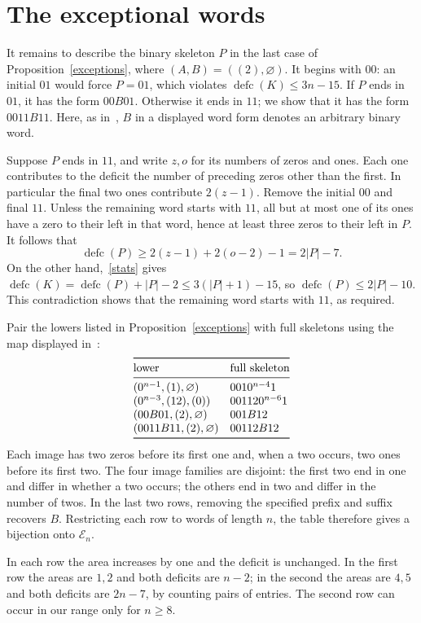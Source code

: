 \documentclass[11pt]{article}
\DeclareMathOperator{\defc}{defc}\DeclareMathOperator{\sym}{sym}
\begin{document}
\section{The exceptional words}
It remains to describe the binary skeleton $P$ in the last case of Proposition~\ref{exceptions}, where $(A,B)=((2),\varnothing)$. It begins with $00$: an initial $01$ would force $P=01$, which violates $\defc(K)\le3n-15$. If $P$ ends in $01$, it has the form $00B01$. Otherwise it ends in $11$; we show that it has the form $0011B11$. Here, as in~\cite[\S6.3]{H}, $B$ in a displayed word form denotes an arbitrary binary word.

Suppose $P$ ends in $11$, and write $z,o$ for its numbers of zeros and ones. Each one contributes to the deficit the number of preceding zeros other than the first. In particular the final two ones contribute $2(z-1)$. Remove the initial $00$ and final $11$. Unless the remaining word starts with $11$, all but at most one of its ones have a zero to their left in that word, hence at least three zeros to their left in $P$. It follows that
\[
 \defc(P)\ge 2(z-1)+2(o-2)-1=2|P|-7.
\]
On the other hand,~\eqref{stats} gives $\defc(K)=\defc(P)+|P|-2\le3(|P|+1)-15$, so $\defc(P)\le2|P|-10$. This contradiction shows that the remaining word starts with $11$, as required.

Pair the lowers listed in Proposition~\ref{exceptions} with full skeletons using the map displayed in~\cite[\S6.3]{H}:
\[
\begin{array}{@{}ll@{}}\toprule
 \text{lower}&\text{full skeleton}\\\midrule
 (0^{n-1},(1),\varnothing)&0010^{n-4}1\\
 (0^{n-3},(12),(0))&001120^{n-6}1\\
 (00B01,(2),\varnothing)&001B12\\
 (0011B11,(2),\varnothing)&00112B12\\\bottomrule
\end{array}
\]
Each image has two zeros before its first one and, when a two occurs, two ones before its first two. The four image families are disjoint: the first two end in one and differ in whether a two occurs; the others end in two and differ in the number of twos. In the last two rows, removing the specified prefix and suffix recovers $B$. Restricting each row to words of length $n$, the table therefore gives a bijection onto $\mathcal E_n$.

In each row the area increases by one and the deficit is unchanged. In the first row the areas are $1,2$ and both deficits are $n-2$; in the second the areas are $4,5$ and both deficits are $2n-7$, by counting pairs of entries. The second row can occur in our range only for $n\ge8$.
\end{document}
